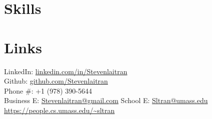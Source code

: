 \sectionsep


\section{Skills}


\sectionsep


\section{Links}
LinkedIn:   \hfill \href{https://www.linkedin.com/in/stevenlaitran/}{linkedin.com/in/Stevenlaitran} \\
Github:     \hfill \href{https://github.com/stevenlaitran}{github.com/Stevenlaitran} \\
Phone \#:   \hfill +1 (978) 390-5644 \\
Business E: \hfill \href{mailto:stevenlaitran@gmail.com}{Stevenlaitran@gmail.com} 
School E:   \hfill \href{mailto:Sltran@umass.edu}{Sltran@umass.edu} \\
            \hfill \href{https://people.cs.umass.edu/~sltran}{https://people.cs.umass.edu/\textasciitilde{}sltran} \\

